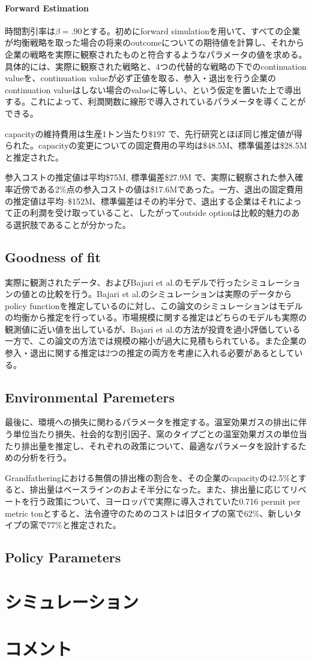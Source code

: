 \documentclass[11pt]{jsarticle}
\begin{document}
\paragraph{Forward Estimation}

時間割引率は$\beta = .90$とする。初めにforward simulationを用いて、すべての企業が均衡戦略を取った場合の将来のoutcomeについての期待値を計算し、それから企業の戦略を実際に観察されたものと符合するようなパラメータの値を求める。具体的には、実際に観察された戦略と、4つの代替的な戦略の下でのcontinuation valueを、continuation valueが必ず正値を取る、参入・退出を行う企業のcontinuation valueはしない場合のvalueに等しい、という仮定を置いた上で導出する。これによって、利潤関数に線形で導入されているパラメータを導くことができる。

capacityの維持費用は生産1トン当たり\$197 で、先行研究とほぼ同じ推定値が得られた。capacityの変更についての固定費用の平均は\$48.5M、標準偏差は\$28.5M と推定された。

参入コストの推定値は平均\$75M, 標準偏差\$27.9M で、実際に観察された参入確率近傍である2\%点の参入コストの値は\$17.6Mであった。一方、退出の固定費用の推定値は平均--\$152M、標準偏差はその約半分で、退出する企業はそれによって正の利潤を受け取っていること、したがってoutside optionは比較的魅力のある選択肢であることが分かった。

\subsection{Goodness of fit}

実際に観測されたデータ、およびBajari et al.のモデルで行ったシミュレーションの値との比較を行う。Bajari et al.のシミュレーションは実際のデータからpolicy functionを推定しているのに対し、この論文のシミュレーションはモデルの均衡から推定を行っている。市場規模に関する推定はどちらのモデルも実際の観測値に近い値を出しているが、Bajari et al.の方法が投資を過小評価している一方で、この論文の方法では規模の縮小が過大に見積もられている。また企業の参入・退出に関する推定は2つの推定の両方を考慮に入れる必要があるとしている。


\subsection{Environmental Paremeters}

最後に、環境への損失に関わるパラメータを推定する。温室効果ガスの排出に伴う単位当たり損失、社会的な割引因子、窯のタイプごとの温室効果ガスの単位当たり排出量を推定し、それぞれの政策について、最適なパラメータを設計するための分析を行う。

Grandfatheringにおける無償の排出権の割合を、その企業のcapacityの42.5\%とすると、排出量はベースラインのおよそ半分になった。また、排出量に応じてリベートを行う政策について、ヨーロッパで実際に導入されていた0.716 permit per metric tonとすると、法令遵守のためのコストは旧タイプの窯で62\%、新しいタイプの窯で77\%と推定された。

\subsection{Policy Parameters}


\section{シミュレーション}

\section{コメント}
\end{document}
